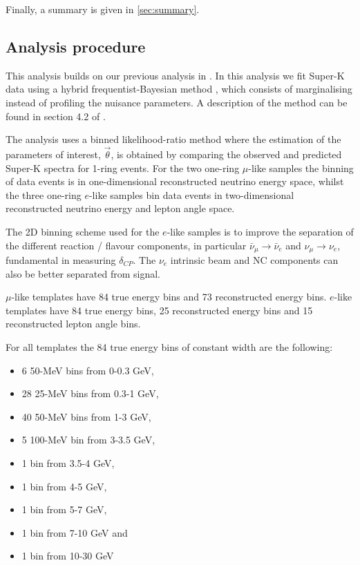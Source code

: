 Finally, a summary is given in \cref{sec:summary}.

\subsection{Analysis procedure}

This analysis builds on our previous analysis in \cite{OurRun17cCC1piJointAnalysis3Flavour}. In this analysis we fit Super-K data using a hybrid frequentist-Bayesian method \cite{CousinsHighland}, which consists of marginalising instead of profiling the nuisance parameters. A description of the method can be found in section 4.2 of \cite{OurRun56AntiNueBarAppearanceAnalysis3Flavour}.

The analysis uses a binned likelihood-ratio method \cite{StatAnalysisCowan} where the estimation of the parameters of interest, $\vec{\theta}$, is obtained by comparing the observed and predicted Super-K spectra for 1-ring events. For the two one-ring $\mu$-like samples the binning of data events is in one-dimensional reconstructed neutrino energy space, whilst the three one-ring $e$-like samples bin data events in two-dimensional reconstructed neutrino energy and lepton angle space.

The 2D binning scheme used for the $e$-like samples is to improve the separation of the different reaction / flavour components, in particular $\bar{\nu}_{\mu} \rightarrow \bar{\nu}_e$ and $\nu_{\mu} \rightarrow \nu_e$, fundamental in measuring $\delta_{CP}$. The $\nu_e$ intrinsic beam and NC components can also be better separated from signal.

$\mu$-like templates have 84 true energy bins and 73 reconstructed energy bins. $e$-like templates have 84 true energy bins, 25 reconstructed energy bins and 15 reconstructed lepton angle bins.

For all templates the 84 true energy bins of constant width are the following:
\begin{itemize}
	\item 6 50-MeV bins from 0-0.3 GeV, 
	\item 28 25-MeV bins from 0.3-1 GeV,
	\item 40 50-MeV bins from 1-3 GeV,
	\item 5 100-MeV bin from 3-3.5 GeV,
	\item 1 bin from 3.5-4 GeV,
	\item 1 bin from 4-5 GeV,
	\item 1 bin from 5-7 GeV,
	\item 1 bin from 7-10 GeV and 
	\item 1 bin from 10-30 GeV
\end{itemize}

